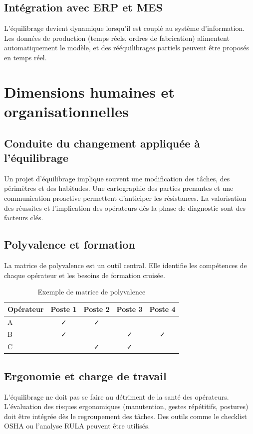 \documentclass[12pt,a4paper]{article}
\begin{document}
\begin{center}
\subsection{Intégration avec ERP et MES}
L’équilibrage devient dynamique lorsqu’il est couplé au système d’information. Les données de production (temps réels, ordres de fabrication) alimentent automatiquement le modèle, et des rééquilibrages partiels peuvent être proposés en temps réel.

\section{Dimensions humaines et organisationnelles}

\subsection{Conduite du changement appliquée à l’équilibrage}
Un projet d’équilibrage implique souvent une modification des tâches, des périmètres et des habitudes. Une cartographie des parties prenantes et une communication proactive permettent d’anticiper les résistances. La valorisation des réussites et l’implication des opérateurs dès la phase de diagnostic sont des facteurs clés.

\subsection{Polyvalence et formation}
La matrice de polyvalence est un outil central. Elle identifie les compétences de chaque opérateur et les besoins de formation croisée.

\begin{table}[H]
\centering
\caption{Exemple de matrice de polyvalence}
\label{tab:polyvalence}
\begin{tabular}{|l|c|c|c|c|}
\hline
\textbf{Opérateur} & \textbf{Poste 1} & \textbf{Poste 2} & \textbf{Poste 3} & \textbf{Poste 4} \\ \hline
A & ✓ & ✓ & & \\
B & ✓ & & ✓ & ✓ \\
C & & ✓ & ✓ & \\
\hline
\end{tabular}
\end{table}

\subsection{Ergonomie et charge de travail}
L’équilibrage ne doit pas se faire au détriment de la santé des opérateurs. L’évaluation des risques ergonomiques (manutention, gestes répétitifs, postures) doit être intégrée dès le regroupement des tâches. Des outils comme le checklist OSHA ou l’analyse RULA peuvent être utilisés.


\end{center}
\end{document}
